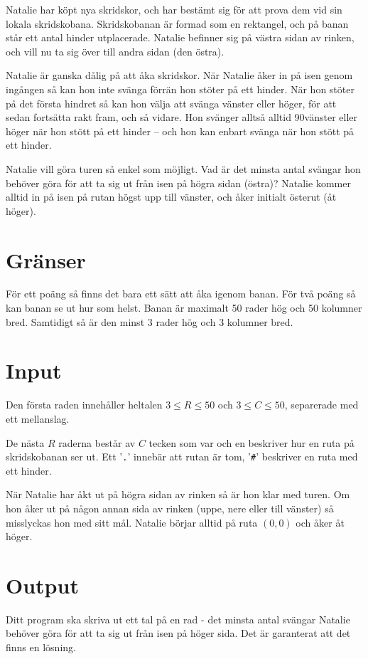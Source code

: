 Natalie har köpt nya skridskor, och har bestämt sig för att prova dem vid sin
lokala skridskobana. Skridskobanan är formad som en rektangel, och på banan
står ett antal hinder utplacerade. Natalie befinner sig på västra sidan av rinken,
och vill nu ta sig över till andra sidan (den östra).

Natalie är ganska dålig på att åka skridskor. När Natalie åker in på isen
genom ingången så kan hon inte svänga förrän hon stöter på ett hinder. När hon
stöter på det första hindret så kan hon välja att svänga vänster eller höger,
för att sedan fortsätta rakt fram, och så vidare. Hon svänger alltså alltid
90\textdegree vänster eller höger när hon stött på ett hinder -- och hon kan enbart svänga
när hon stött på ett hinder.

Natalie vill göra turen så enkel som möjligt. Vad är det minsta antal svängar
hon behöver göra för att ta sig ut från isen på högra sidan (östra)?
Natalie kommer alltid in på isen på rutan högst upp till vänster, och åker
initialt österut (åt höger).

\section*{Gränser}
För ett poäng så finns det bara ett sätt att åka igenom banan. För två poäng så
kan banan se ut hur som helst. Banan
är maximalt 50 rader hög och 50 kolumner bred. Samtidigt så är den minst 3 rader hög
och 3 kolumner bred.

\section*{Input}
Den första raden innehåller heltalen $3 \le R \le 50$ och $3 \le C \le 50$,
separerade med ett mellanslag.

De nästa $R$ raderna består av $C$ tecken som var och en beskriver hur en ruta
på skridskobanan ser ut. Ett '\texttt{.}' innebär att rutan är tom,
'\texttt{\#}' beskriver en ruta med ett hinder.

När Natalie har åkt ut på högra sidan av rinken så är hon klar med turen. Om hon åker
ut på någon annan sida av rinken (uppe, nere eller till vänster) så misslyckas hon med
sitt mål. Natalie börjar alltid på ruta $(0,0)$ och åker åt höger.

\section*{Output}
Ditt program ska skriva ut ett tal på en rad - det minsta antal svängar Natalie
behöver göra för att ta sig ut från isen på höger sida. Det är garanterat att
det finns en lösning.


